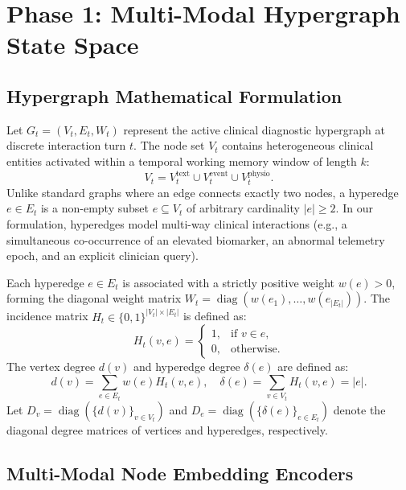\documentclass[10pt, onecolumn]{article}
\DeclareMathOperator{\diag}{diag}
\begin{document}
\section{Phase 1: Multi-Modal Hypergraph State Space}
\label{sec:phase1}

\subsection{Hypergraph Mathematical Formulation}

Let $G_t = (V_t, E_t, W_t)$ represent the active clinical diagnostic hypergraph at discrete interaction turn $t$. The node set $V_t$ contains heterogeneous clinical entities activated within a temporal working memory window of length $k$:
\begin{equation}
  V_t = V_t^{\text{text}} \cup V_t^{\text{event}} \cup V_t^{\text{physio}}.
  \label{eq:node_partition}
\end{equation}
Unlike standard graphs where an edge connects exactly two nodes, a hyperedge $e \in E_t$ is a non-empty subset $e \subseteq V_t$ of arbitrary cardinality $|e| \ge 2$. In our formulation, hyperedges model multi-way clinical interactions (e.g., a simultaneous co-occurrence of an elevated biomarker, an abnormal telemetry epoch, and an explicit clinician query).

Each hyperedge $e \in E_t$ is associated with a strictly positive weight $w(e) > 0$, forming the diagonal weight matrix $W_t = \diag(w(e_1), \dots, w(e_{|E_t|}))$. The incidence matrix $H_t \in \{0, 1\}^{|V_t| \times |E_t|}$ is defined as:
\begin{equation}
  H_t(v, e) = \begin{cases} 1, & \text{if } v \in e, \\ 0, & \text{otherwise.} \end{cases}
  \label{eq:incidence}
\end{equation}
The vertex degree $d(v)$ and hyperedge degree $\delta(e)$ are defined as:
\begin{equation}
  d(v) = \sum_{e \in E_t} w(e) H_t(v, e), \quad \delta(e) = \sum_{v \in V_t} H_t(v, e) = |e|.
  \label{eq:degrees}
\end{equation}
Let $D_v = \diag(\{d(v)\}_{v \in V_t})$ and $D_e = \diag(\{\delta(e)\}_{e \in E_t})$ denote the diagonal degree matrices of vertices and hyperedges, respectively.

\subsection{Multi-Modal Node Embedding Encoders}
\end{document}
